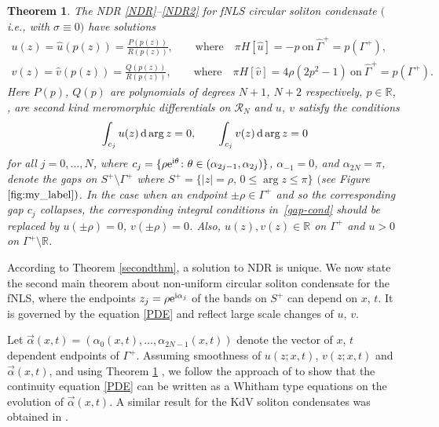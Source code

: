\documentclass[10pt,a4paper]{amsart}
\numberwithin{equation}{section}
\newtheorem{Theorem}{Theorem}[section]
\newcommand{\G}{\Gamma}
\def\R{{\mathbb R}}
\def\a{\alpha}
\def\G{\Gamma}
\begin{document}
\begin{Theorem}\label{th-main-1}
The NDR \eqref{NDR}--\eqref{NDR2} for fNLS circular soliton condensate $($i.e., with $\sigma\equiv 0)$ have solutions
\begin{gather}%
u(z)= \hat u(p(z))= \frac{P(p(z))}{ R(p(z))}, \qquad \text{where} \quad \pi H[\hat u]=-p \ \text{on}\ \hat\G^+=p(\G^+),\nonumber\\
v(z)= \hat v(p(z))=\frac{ Q(p(z))}{ R(p(z))},\qquad \text{where} \quad \pi H[\hat v]=4\rho(2p^2-1)
\ \text{on}\ \hat\G^+=p(\G^+). \label{NDRinMain2}
\end{gather}
Here $P(p)$, $Q(p)$ are polynomials of degrees $N+1$, $N+2$ respectively, $p\in\R$, ,  are
second kind meromorphic differentials on $\mathcal{R}_N$ and
$u$, $v$ satisfy the conditions
\begin{gather} \label{gap-cond}
\int_{c_j} u(z)\,{\rm d}\arg z=0, \qquad
\int_{c_j} v(z)\,{\rm d}\arg z=0
\end{gather}
for all
$j=0,\dots,N$, where $c_j=\{\rho {\rm e}^{{\rm i}\theta}\colon \theta\in (\alpha_{2j-1},\alpha_{2j})\}$, $\alpha_{-1}=0$, and $\alpha_{2N}=\pi$, denote the gaps on $S^+\setminus \G^+$ where
$S^+=\{|z|=\rho,\, 0\leq \arg z\leq \pi\}$ $($see Figure~$\ref{fig:my_label})$. In the case when an endpoint $\pm\rho\in\G^+$ and so the corresponding gap $c_j$ collapses, the corresponding integral conditions in~\eqref{gap-cond} should be replaced by $u(\pm\rho)=0$,
$v(\pm\rho)=0$. Also, $u(z),v(z)\in\R$ on $\G^+$ and $u>0$ on $\G^+\setminus\R$.
\end{Theorem}

According to Theorem \ref{secondthm}, a solution to NDR is unique.
We now state the second main theorem about non-uniform circular soliton condensate for the fNLS,
where the endpoints ${z_j=\rho {\rm e}^{{\rm i}\a_j}}$ of the bands on $S^+$ can depend on $x$, $t$.
It is governed by the equation \eqref{PDE}
and reflect large scale changes of $u$, $v$.

Let $\vec \a(x,t)=(\a_0(x,t),\dots,\a_{2N-1}(x,t))$ denote the vector of $x$, $t$ dependent endpoints of $\G^+$. Assuming smoothness of $u(z;x,t)$, $v(z;x,t)$ and
$\vec \a(x,t)$, and using Theorem \ref{th-main-1} , we follow the approach of \cite{FFM} to show that
the continuity equation \eqref{PDE} can be written as a Whitham type equations on the evolution of $\vec \a(x,t)$. A similar result for the KdV soliton condensates was obtained in \cite{CERT}.
\end{document}
